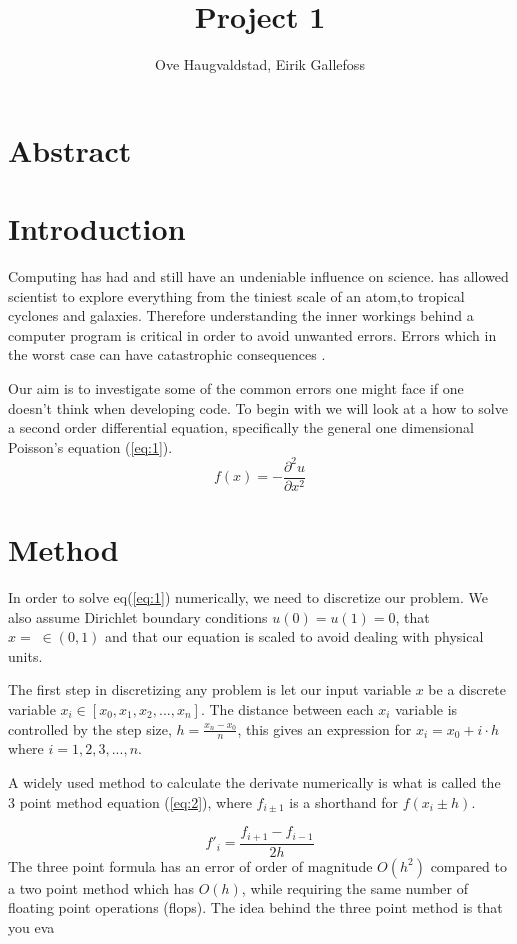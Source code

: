 \documentclass[a4paper,12pt,english]{article}
\title{Project 1 }
\author{Ove Haugvaldstad, Eirik Gallefoss}
\newcommand{\pd}[2][]{\frac{\partial#1}{\partial#2}}
\begin{document}
\maketitle

\section*{Abstract}
\newpage
{}
\section*{Introduction}
Computing has had and still have an undeniable influence on science. 
has allowed scientist to explore everything from the tiniest scale of an atom,to tropical cyclones and galaxies. 
Therefore understanding the inner workings behind a computer program is critical in order to avoid unwanted errors. Errors which in the worst case can have catastrophic consequences \cite{sleipner_failure}. \par Our aim is to investigate some of the common errors one might face if one doesn't think when developing code. To begin with we will look at a how to solve a second order differential equation, specifically the general one dimensional Poisson's equation (\ref{eq:1}). 
\begin{equation}\label{eq:1}
  f(x)= - \pd[^2u]{x^2}
\end{equation}

\section*{Method}
In order to solve eq(\ref{eq:1}) numerically, we need to discretize our problem. We also assume Dirichlet boundary conditions $u(0) = u(1) = 0$, that $x = \; \in (0,1)$ and that our equation is scaled to avoid dealing with physical units. \par The first step in discretizing any problem is let our input variable $x$ be a discrete variable $x_i \in \left[x_0, x_1, x_2, ..., x_n \right]$. The distance between each $x_i$ variable is controlled by the step size, $h = \frac{x_n -x_0}{n}$, this gives an expression for $x_i = x_0 + i\cdot h$ where $i = 1,2,3, ..., n$. 
\par A widely used method to calculate the derivate numerically is what is called the 3 point method equation (\ref{eq:2}), where $f_{i \pm 1}$ is a shorthand for $ f(x_i \pm h)$.   

\begin{equation}\label{eq:2}
  f'_i = \frac{f_{i+1} - f_{i-1}}{2h}
\end{equation}
The three point formula has an error of order of magnitude $O(h^2)$ compared to a two point method which has $O(h)$, while requiring the same number of floating point operations (flops). The idea behind the three point method is that you eva    
\newpage
\printbibliography
\end{document}
